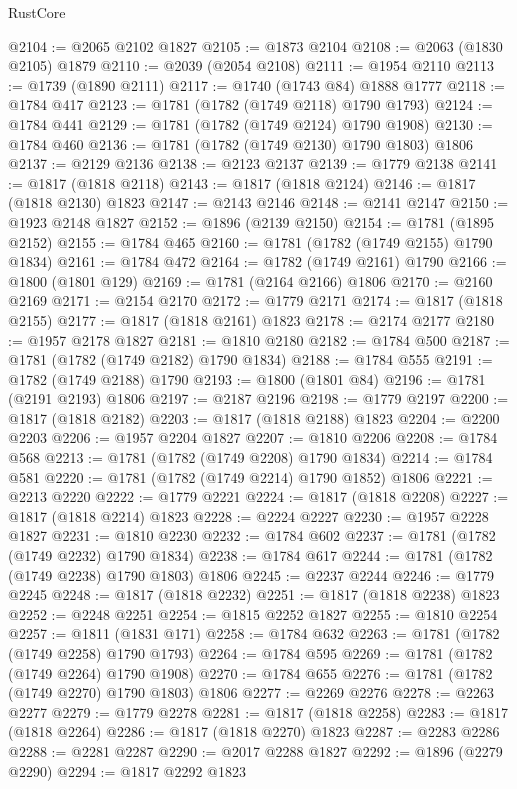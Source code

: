 \begin{lexlean}{RustCore}
\begin{coremodule}
@2104 := @2065 @2102 @1827
@2105 := @1873 @2104
@2108 := @2063 (@1830 @2105) @1879
@2110 := @2039 (@2054 @2108)
@2111 := @1954 @2110
@2113 := @1739 (@1890 @2111)
@2117 := @1740 (@1743 @84) @1888 @1777
@2118 := @1784 @417
@2123 := @1781 (@1782 (@1749 @2118) @1790 @1793)
@2124 := @1784 @441
@2129 := @1781 (@1782 (@1749 @2124) @1790 @1908)
@2130 := @1784 @460
@2136 := @1781 (@1782 (@1749 @2130) @1790 @1803) @1806
@2137 := @2129 @2136
@2138 := @2123 @2137
@2139 := @1779 @2138
@2141 := @1817 (@1818 @2118)
@2143 := @1817 (@1818 @2124)
@2146 := @1817 (@1818 @2130) @1823
@2147 := @2143 @2146
@2148 := @2141 @2147
@2150 := @1923 @2148 @1827
@2152 := @1896 (@2139 @2150)
@2154 := @1781 (@1895 @2152)
@2155 := @1784 @465
@2160 := @1781 (@1782 (@1749 @2155) @1790 @1834)
@2161 := @1784 @472
@2164 := @1782 (@1749 @2161) @1790
@2166 := @1800 (@1801 @129)
@2169 := @1781 (@2164 @2166) @1806
@2170 := @2160 @2169
@2171 := @2154 @2170
@2172 := @1779 @2171
@2174 := @1817 (@1818 @2155)
@2177 := @1817 (@1818 @2161) @1823
@2178 := @2174 @2177
@2180 := @1957 @2178 @1827
@2181 := @1810 @2180
@2182 := @1784 @500
@2187 := @1781 (@1782 (@1749 @2182) @1790 @1834)
@2188 := @1784 @555
@2191 := @1782 (@1749 @2188) @1790
@2193 := @1800 (@1801 @84)
@2196 := @1781 (@2191 @2193) @1806
@2197 := @2187 @2196
@2198 := @1779 @2197
@2200 := @1817 (@1818 @2182)
@2203 := @1817 (@1818 @2188) @1823
@2204 := @2200 @2203
@2206 := @1957 @2204 @1827
@2207 := @1810 @2206
@2208 := @1784 @568
@2213 := @1781 (@1782 (@1749 @2208) @1790 @1834)
@2214 := @1784 @581
@2220 := @1781 (@1782 (@1749 @2214) @1790 @1852) @1806
@2221 := @2213 @2220
@2222 := @1779 @2221
@2224 := @1817 (@1818 @2208)
@2227 := @1817 (@1818 @2214) @1823
@2228 := @2224 @2227
@2230 := @1957 @2228 @1827
@2231 := @1810 @2230
@2232 := @1784 @602
@2237 := @1781 (@1782 (@1749 @2232) @1790 @1834)
@2238 := @1784 @617
@2244 := @1781 (@1782 (@1749 @2238) @1790 @1803) @1806
@2245 := @2237 @2244
@2246 := @1779 @2245
@2248 := @1817 (@1818 @2232)
@2251 := @1817 (@1818 @2238) @1823
@2252 := @2248 @2251
@2254 := @1815 @2252 @1827
@2255 := @1810 @2254
@2257 := @1811 (@1831 @171)
@2258 := @1784 @632
@2263 := @1781 (@1782 (@1749 @2258) @1790 @1793)
@2264 := @1784 @595
@2269 := @1781 (@1782 (@1749 @2264) @1790 @1908)
@2270 := @1784 @655
@2276 := @1781 (@1782 (@1749 @2270) @1790 @1803) @1806
@2277 := @2269 @2276
@2278 := @2263 @2277
@2279 := @1779 @2278
@2281 := @1817 (@1818 @2258)
@2283 := @1817 (@1818 @2264)
@2286 := @1817 (@1818 @2270) @1823
@2287 := @2283 @2286
@2288 := @2281 @2287
@2290 := @2017 @2288 @1827
@2292 := @1896 (@2279 @2290)
@2294 := @1817 @2292 @1823

\end{coremodule}
\end{lexlean}
